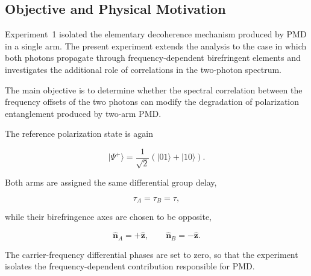 

\subsection{Objective and Physical Motivation}

Experiment~1 isolated the elementary decoherence mechanism produced by PMD in a
single arm. The present experiment extends the analysis to the case in which both
photons propagate through frequency-dependent birefringent elements and investigates
the additional role of correlations in the two-photon spectrum.

The main objective is to determine whether the spectral correlation between the
frequency offsets of the two photons can modify the degradation of polarization
entanglement produced by two-arm PMD.

The reference polarization state is again

\begin{equation}
|\Psi^+\rangle
=
\frac{1}{\sqrt{2}}
\left(
|01\rangle + |10\rangle
\right).
\label{eq:exp2_input_bell_state}
\end{equation}

Both arms are assigned the same differential group delay,

\begin{equation}
\tau_A=\tau_B=\tau,
\label{eq:exp2_equal_dgd}
\end{equation}

while their birefringence axes are chosen to be opposite,

\begin{equation}
\hat{\mathbf n}_A=+\hat{\mathbf z},
\qquad
\hat{\mathbf n}_B=-\hat{\mathbf z}.
\label{eq:exp2_opposite_axes}
\end{equation}

The carrier-frequency differential phases are set to zero, so that the experiment
isolates the frequency-dependent contribution responsible for PMD.


